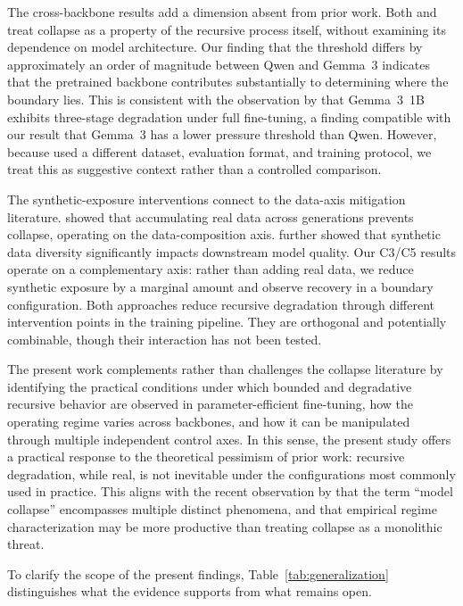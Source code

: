\documentclass[a4paper,fleqn]{cas-dc}
\begin{document}
The cross-backbone results add a dimension absent from prior work. Both
\citet{shumailov2024} and \citet{dohmatob2025} treat collapse as a property of
the recursive process itself, without examining its dependence on model
architecture. Our finding that the threshold differs by approximately an order
of magnitude between Qwen and Gemma~3 indicates that the pretrained backbone
contributes substantially to determining where the boundary lies. This
is consistent with the observation by \citet{keisha2025} that Gemma~3~1B
exhibits three-stage degradation under full fine-tuning, a finding compatible
with our result that Gemma~3 has a lower pressure threshold than Qwen. However,
because \citet{keisha2025} used a different dataset, evaluation format, and
training protocol, we treat this as suggestive context rather than a controlled
comparison.

The synthetic-exposure interventions connect to the data-axis mitigation
literature. \citet{gerstgrasser2024} showed that accumulating real data across
generations prevents collapse, operating on the data-composition axis.
\citet{wang2024diversity} further showed that synthetic data diversity
significantly impacts downstream model quality. Our
C3/C5 results operate on a complementary axis: rather than adding real data, we
reduce synthetic exposure by a marginal amount and observe recovery in a
boundary configuration. Both approaches reduce recursive degradation through
different intervention points in the training pipeline. They are orthogonal and
potentially combinable, though their interaction has not been tested.

The present work complements rather than challenges the collapse literature by
identifying the practical conditions under which bounded and degradative
recursive behavior are observed in parameter-efficient fine-tuning, how the
operating regime varies across backbones, and how it can be manipulated through
multiple independent control axes. In this sense, the present study offers a
practical response to the theoretical pessimism of prior work: recursive
degradation, while real, is not inevitable under the configurations most
commonly used in practice. This aligns with the recent observation by
\citet{schaeffer2025position} that the term ``model collapse'' encompasses
multiple distinct phenomena, and that empirical regime characterization may be
more productive than treating collapse as a monolithic threat.

To clarify the scope of the present findings, Table~\ref{tab:generalization}
distinguishes what the evidence supports from what remains open.
\end{document}
